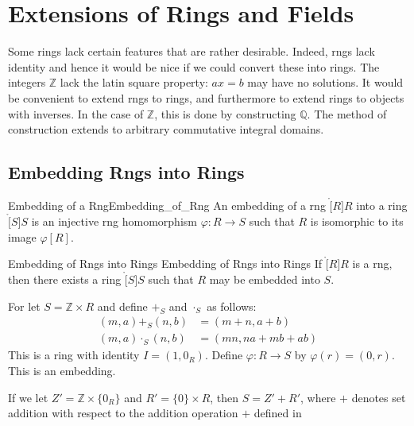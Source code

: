 \documentclass{book}                                                           %
\begin{document}
    \section{Extensions of Rings and Fields}
        Some rings lack certain features that are rather desirable. Indeed,
        rngs lack identity and hence it would be nice if we could convert
        these into rings. The integers $\mathbb{Z}$ lack the latin square
        property: $ax=b$ may have no solutions. It would be convenient to
        extend rngs to rings, and furthermore to extend rings to objects
        with inverses. In the case of $\mathbb{Z}$, this is done by
        constructing $\mathbb{Q}$. The method of construction extends to
        arbitrary commutative integral domains.
        \subsection{Embedding Rngs into Rings}
            \begin{fdefinition}{Embedding of a Rng}{Embedding_of_Rng}
                An embedding of a rng $\ring[R]{R}$ into a ring
                $\ring[S]{S}$ is an injective rng homomorphism
                $\varphi:R\rightarrow{S}$ such that $R$ is isomorphic to its
                image $\varphi[R]$.
            \end{fdefinition}
            \begin{ftheorem}{Embedding of Rngs into Rings}
                            {Embedding of Rngs into Rings}
                If $\ring[R]{R}$ is a rng, then there exists a ring
                $\ring[S]{S}$ such that $R$ may be embedded into $S$.
            \end{ftheorem}
            \begin{bproof}
                For let $S=\mathbb{Z}\times{R}$ and define $+_{S}$ and
                $\cdot_{S}$ as follows:
                \begin{align}
                    (m,a)+_{S}(n,b)&=(m+n,a+b)\\
                    (m,a)\cdot_{S}(n,b)&=(mn,na+mb+ab)
                \end{align}
                This is a ring with identity $I=(1,0_{R})$. Define
                $\varphi:R\rightarrow{S}$ by $\varphi(r)=(0,r)$. This is an
                embedding.
            \end{bproof}
            If we let $Z'=\mathbb{Z}\times\{0_{R}\}$ and
            $R'=\{0\}\times{R}$, then $S=Z'+R'$, where $+$ denotes set
            addition with respect to the addition operation $+$ defined in
\end{document}
